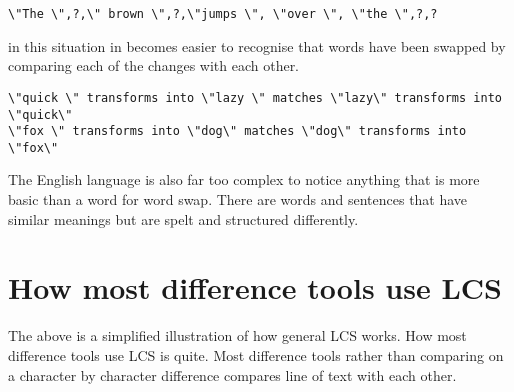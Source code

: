 \begin{verbatim}
\"The \",?,\" brown \",?,\"jumps \", \"over \", \"the \",?,?
\end{verbatim}

in this situation in becomes easier to recognise that words have been swapped by comparing each of the changes with each other.  

\begin{verbatim}
\"quick \" transforms into \"lazy \" matches \"lazy\" transforms into \"quick\"
\"fox \" transforms into \"dog\" matches \"dog\" transforms into \"fox\" 
\end{verbatim}

The English language is also far too complex to notice anything that is more basic than a word for word swap.
There are words and sentences that have similar meanings but are spelt and structured differently.

\section{How most difference tools use LCS}
The above is a simplified illustration of how general LCS works.
How most difference tools use LCS is quite.
Most difference tools rather than comparing on a character by character difference compares line of text with each other.

% 
 
 


